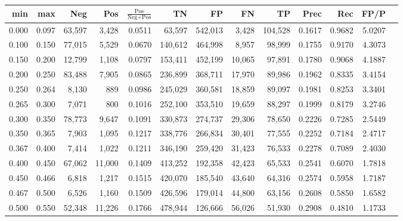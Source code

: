 \begin{tabular}{rrrrrrrrrrrrr}
\toprule
  min &   max &    Neg &    Pos & $\frac{\text{Pos}}{\text{Neg}+\text{Pos}}$ &      TN &      FP &      FN &      TP &   Prec &    Rec &   FP/P \\
\midrule
0.000 & 0.097 & 63,597 &  3,428 &                                     0.0511 &  63,597 & 542,013 &   3,428 & 104,528 & 0.1617 & 0.9682 & 5.0207 \\
0.100 & 0.150 & 77,015 &  5,529 &                                     0.0670 & 140,612 & 464,998 &   8,957 &  98,999 & 0.1755 & 0.9170 & 4.3073 \\
0.150 & 0.200 & 12,799 &  1,108 &                                     0.0797 & 153,411 & 452,199 &  10,065 &  97,891 & 0.1780 & 0.9068 & 4.1887 \\
0.200 & 0.250 & 83,488 &  7,905 &                                     0.0865 & 236,899 & 368,711 &  17,970 &  89,986 & 0.1962 & 0.8335 & 3.4154 \\
0.250 & 0.264 &  8,130 &    889 &                                     0.0986 & 245,029 & 360,581 &  18,859 &  89,097 & 0.1981 & 0.8253 & 3.3401 \\
0.265 & 0.300 &  7,071 &    800 &                                     0.1016 & 252,100 & 353,510 &  19,659 &  88,297 & 0.1999 & 0.8179 & 3.2746 \\
0.300 & 0.350 & 78,773 &  9,647 &                                     0.1091 & 330,873 & 274,737 &  29,306 &  78,650 & 0.2226 & 0.7285 & 2.5449 \\
0.350 & 0.365 &  7,903 &  1,095 &                                     0.1217 & 338,776 & 266,834 &  30,401 &  77,555 & 0.2252 & 0.7184 & 2.4717 \\
0.367 & 0.400 &  7,414 &  1,022 &                                     0.1211 & 346,190 & 259,420 &  31,423 &  76,533 & 0.2278 & 0.7089 & 2.4030 \\
0.400 & 0.450 & 67,062 & 11,000 &                                     0.1409 & 413,252 & 192,358 &  42,423 &  65,533 & 0.2541 & 0.6070 & 1.7818 \\
0.450 & 0.466 &  6,818 &  1,217 &                                     0.1515 & 420,070 & 185,540 &  43,640 &  64,316 & 0.2574 & 0.5958 & 1.7187 \\
0.467 & 0.500 &  6,526 &  1,160 &                                     0.1509 & 426,596 & 179,014 &  44,800 &  63,156 & 0.2608 & 0.5850 & 1.6582 \\
0.500 & 0.550 & 52,348 & 11,226 &                                     0.1766 & 478,944 & 126,666 &  56,026 &  51,930 & 0.2908 & 0.4810 & 1.1733 \\

\end{tabular}
